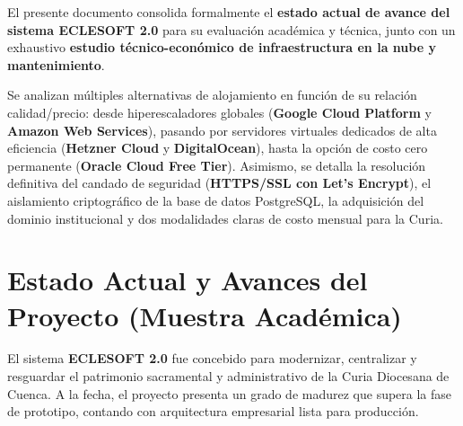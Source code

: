 \documentclass[11pt,a4paper]{article}
\begin{document}
\newpage
\tableofcontents
\newpage

\begin{resumenbox}
El presente documento consolida formalmente el \textbf{estado actual de avance del sistema ECLESOFT 2.0} para su evaluación académica y técnica, junto con un exhaustivo \textbf{estudio técnico-económico de infraestructura en la nube y mantenimiento}.

Se analizan múltiples alternativas de alojamiento en función de su relación calidad/precio: desde hiperescaladores globales (\textbf{Google Cloud Platform} y \textbf{Amazon Web Services}), pasando por servidores virtuales dedicados de alta eficiencia (\textbf{Hetzner Cloud} y \textbf{DigitalOcean}), hasta la opción de costo cero permanente (\textbf{Oracle Cloud Free Tier}). Asimismo, se detalla la resolución definitiva del candado de seguridad (\textbf{HTTPS/SSL con Let's Encrypt}), el aislamiento criptográfico de la base de datos PostgreSQL, la adquisición del dominio institucional y dos modalidades claras de costo mensual para la Curia.
\end{resumenbox}

\vspace{0.5cm}

\section{Estado Actual y Avances del Proyecto (Muestra Académica)}

El sistema \textbf{ECLESOFT 2.0} fue concebido para modernizar, centralizar y resguardar el patrimonio sacramental y administrativo de la Curia Diocesana de Cuenca. A la fecha, el proyecto presenta un grado de madurez que supera la fase de prototipo, contando con arquitectura empresarial lista para producción.
\end{document}

